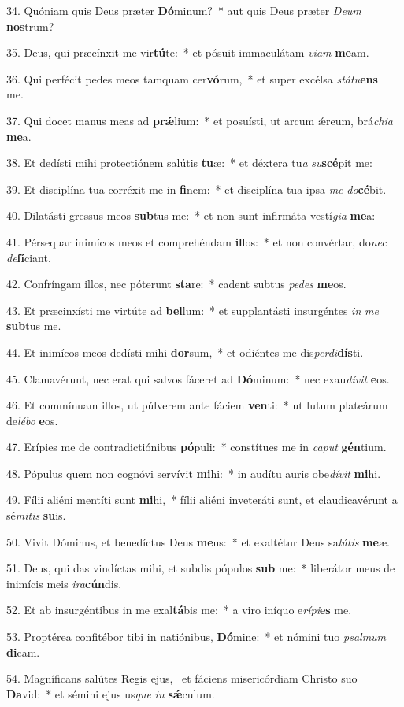34. Quóniam quis Deus præter \textbf{Dó}minum?~*  aut quis Deus præter \textit{De}\textit{um} \textbf{nos}trum?\

35. Deus, qui præcínxit me vir\textbf{tú}te:~*  et pósuit immaculátam \textit{vi}\textit{am} \textbf{me}am.\

36. Qui perfécit pedes meos tamquam cer\textbf{vó}rum,~*  et super excélsa \textit{stá}\textit{tu}\textbf{ens} me.\

37. Qui docet manus meas ad \textbf{prǽ}lium:~*  et posuísti, ut arcum ǽreum, brá\textit{chi}\textit{a} \textbf{me}a.\

38. Et dedísti mihi protectiónem salútis \textbf{tu}æ:~*  et déxtera tu\textit{a} \textit{su}\textbf{scé}pit me:\

39. Et disciplína tua corréxit me in \textbf{fi}nem:~*  et disciplína tua ipsa \textit{me} \textit{do}\textbf{cé}bit.\

40. Dilatásti gressus meos \textbf{sub}tus me:~*  et non sunt infirmáta vestí\textit{gi}\textit{a} \textbf{me}a:\

41. Pérsequar inimícos meos et comprehéndam \textbf{il}los:~*  et non convértar, do\textit{nec} \textit{de}\textbf{fí}ciant.\

42. Confríngam illos, nec póterunt \textbf{sta}re:~*  cadent subtus \textit{pe}\textit{des} \textbf{me}os.\

43. Et præcinxísti me virtúte ad \textbf{bel}lum:~*  et supplantásti insurgéntes \textit{in} \textit{me} \textbf{sub}tus me.\

44. Et inimícos meos dedísti mihi \textbf{dor}sum,~*  et odiéntes me dis\textit{per}\textit{di}\textbf{dís}ti.\

45. Clamavérunt, nec erat qui salvos fáceret ad \textbf{Dó}minum:~*  nec exau\textit{dí}\textit{vit} \textbf{e}os.\

46. Et commínuam illos, ut púlverem ante fáciem \textbf{ven}ti:~*  ut lutum plateárum de\textit{lé}\textit{bo} \textbf{e}os.\

47. Erípies me de contradictiónibus \textbf{pó}puli:~*  constítues me in \textit{ca}\textit{put} \textbf{gén}tium.\

48. Pópulus quem non cognóvi servívit \textbf{mi}hi:~*  in audítu auris obe\textit{dí}\textit{vit} \textbf{mi}hi.\

49. Fílii aliéni mentíti sunt \textbf{mi}hi,~*  fílii aliéni inveteráti sunt, et claudicavérunt a sé\textit{mi}\textit{tis} \textbf{su}is.\

50. Vivit Dóminus, et benedíctus Deus \textbf{me}us:~*  et exaltétur Deus sa\textit{lú}\textit{tis} \textbf{me}æ.\

51. Deus, qui das vindíctas mihi, et subdis pópulos \textbf{sub} me:~*  liberátor meus de inimícis meis \textit{i}\textit{ra}\textbf{cún}dis.\

52. Et ab insurgéntibus in me exal\textbf{tá}bis me:~*  a viro iníquo e\textit{rí}\textit{pi}\textbf{es} me.\

53. Proptérea confitébor tibi in natiónibus, \textbf{Dó}mine:~*  et nómini tuo \textit{psal}\textit{mum} \textbf{di}cam.\

54. Magníficans salútes Regis ejus, \dag\  et fáciens misericórdiam Christo suo \textbf{Da}vid:~*  et sémini ejus us\textit{que} \textit{in} \textbf{sǽ}culum.\

